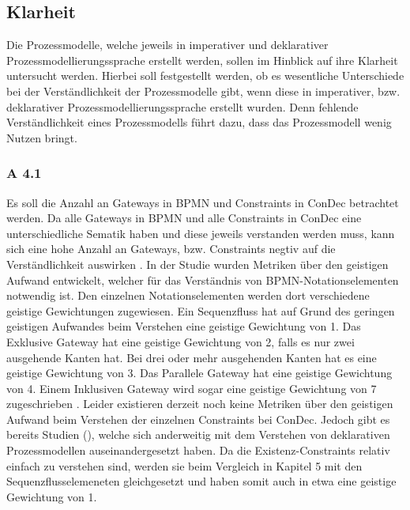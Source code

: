 \subsection{Klarheit}


Die Prozessmodelle, welche jeweils in imperativer und deklarativer Prozessmodellierungssprache erstellt werden, sollen im Hinblick auf ihre Klarheit untersucht werden. Hierbei soll festgestellt werden, ob es wesentliche Unterschiede bei der Verständlichkeit der Prozessmodelle gibt, wenn diese in imperativer, bzw. deklarativer Prozessmodellierungssprache erstellt wurden. Denn fehlende Verständlichkeit eines Prozessmodells führt dazu, dass das Prozessmodell wenig Nutzen bringt. 


\subsubsection{A 4.1}
Es soll die Anzahl an Gateways in BPMN und Constraints in ConDec betrachtet werden. Da alle Gateways in BPMN und alle Constraints in ConDec eine unterschiedliche Sematik haben und diese jeweils verstanden werden muss, kann sich eine hohe Anzahl an Gateways, bzw. Constraints negtiv auf die Verständlichkeit auswirken \cite{gruhn2006adopting, thesis_maja}. \newline
In der Studie \cite{gruhn2006adopting} wurden Metriken über den geistigen Aufwand entwickelt, welcher für das Verständnis von BPMN-Notationselementen notwendig ist. Den einzelnen Notationselementen werden dort verschiedene geistige Gewichtungen zugewiesen. Ein Sequenzfluss hat auf Grund des geringen geistigen Aufwandes beim Verstehen eine geistige Gewichtung von 1. Das Exklusive Gateway hat eine geistige Gewichtung von 2, falls es nur zwei ausgehende Kanten hat. Bei drei oder mehr ausgehenden Kanten hat es eine geistige Gewichtung von 3. Das Parallele Gateway hat eine geistige Gewichtung von 4. Einem Inklusiven Gateway wird sogar eine geistige Gewichtung von 7 zugeschrieben \cite{gruhn2006adopting}.\newline
Leider existieren derzeit noch keine Metriken über den geistigen Aufwand beim Verstehen der einzelnen Constraints bei ConDec. Jedoch gibt es bereits Studien (\cite{thesis_maja,haisjackl2014understanding}), welche sich anderweitig mit dem Verstehen von deklarativen Prozessmodellen auseinandergesetzt haben. Da die Existenz-Constraints relativ einfach zu verstehen sind, werden sie beim Vergleich in Kapitel 5 mit den Sequenzflusselemeneten gleichgesetzt und haben somit auch in etwa eine geistige Gewichtung von 1. \newline
